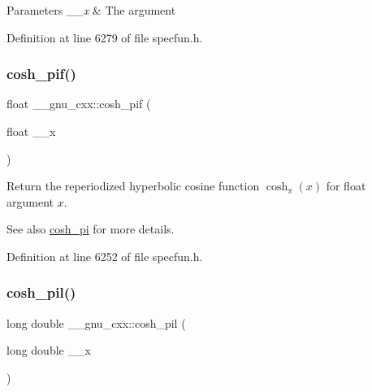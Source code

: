\begin{DoxyParams}{Parameters}
{\em \+\_\+\+\_\+x} & The argument \\
\hline
\end{DoxyParams}


Definition at line 6279 of file specfun.\+h.

\mbox{\label{group__gnu__math__spec__func_ga79a2f5c9da96b5ea6c663d6efca24944}} 
\subsubsection{\texorpdfstring{cosh\+\_\+pif()}{cosh\_pif()}}
{\footnotesize\ttfamily float \+\_\+\+\_\+gnu\+\_\+cxx\+::cosh\+\_\+pif (\begin{DoxyParamCaption}\item[{float}]{\+\_\+\+\_\+x }\end{DoxyParamCaption})\hspace{0.3cm}{\ttfamily [inline]}}

Return the reperiodized hyperbolic cosine function $ \cosh_\pi(x) $ for {\ttfamily float} argument $ x $.

\begin{DoxySeeAlso}{See also}
\hyperlink{group__gnu__math__spec__func_gaf59c68a01adfdab0f22c4fb405ab2a36}{cosh\+\_\+pi} for more details. 
\end{DoxySeeAlso}


Definition at line 6252 of file specfun.\+h.

\mbox{\label{group__gnu__math__spec__func_gab7bf4f591dd35af2bdb88a8219f5e248}} 
\subsubsection{\texorpdfstring{cosh\+\_\+pil()}{cosh\_pil()}}
{\footnotesize\ttfamily long double \+\_\+\+\_\+gnu\+\_\+cxx\+::cosh\+\_\+pil (\begin{DoxyParamCaption}\item[{long double}]{\+\_\+\+\_\+x }\end{DoxyParamCaption})\hspace{0.3cm}{\ttfamily [inline]}}

